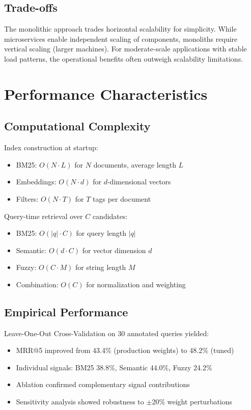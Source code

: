 \subsection{Trade-offs}

The monolithic approach trades horizontal scalability for simplicity. While microservices enable independent scaling of components, monoliths require vertical scaling (larger machines). For moderate-scale applications with stable load patterns, the operational benefits often outweigh scalability limitations.

\section{Performance Characteristics}

\subsection{Computational Complexity}

Index construction at startup:
\begin{itemize}[leftmargin=*,itemsep=2pt,topsep=2pt]
\item BM25: $O(N \cdot L)$ for $N$ documents, average length $L$
\item Embeddings: $O(N \cdot d)$ for $d$-dimensional vectors
\item Filters: $O(N \cdot T)$ for $T$ tags per document
\end{itemize}

Query-time retrieval over $C$ candidates:
\begin{itemize}[leftmargin=*,itemsep=2pt,topsep=2pt]
\item BM25: $O(|q| \cdot C)$ for query length $|q|$
\item Semantic: $O(d \cdot C)$ for vector dimension $d$
\item Fuzzy: $O(C \cdot M)$ for string length $M$
\item Combination: $O(C)$ for normalization and weighting
\end{itemize}

\subsection{Empirical Performance}

Leave-One-Out Cross-Validation on 30 annotated queries yielded:
\begin{itemize}[leftmargin=*,itemsep=2pt,topsep=2pt]
\item MRR@5 improved from 43.4\% (production weights) to 48.2\% (tuned)
\item Individual signals: BM25 38.8\%, Semantic 44.0\%, Fuzzy 24.2\%
\item Ablation confirmed complementary signal contributions
\item Sensitivity analysis showed robustness to $\pm$20\% weight perturbations
\end{itemize}

